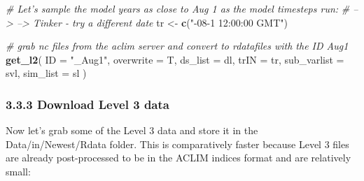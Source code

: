 \documentclass[
]{article}
\newenvironment{Shaded}{\begin{snugshade}}{\end{snugshade}}
\newcommand{\CommentTok}[1]{\textcolor[rgb]{0.56,0.35,0.01}{\textit{#1}}}
\newcommand{\DataTypeTok}[1]{\textcolor[rgb]{0.13,0.29,0.53}{#1}}
\newcommand{\KeywordTok}[1]{\textcolor[rgb]{0.13,0.29,0.53}{\textbf{#1}}}
\newcommand{\NormalTok}[1]{#1}
\newcommand{\StringTok}[1]{\textcolor[rgb]{0.31,0.60,0.02}{#1}}
\begin{document}
\begin{Shaded}
\begin{Highlighting}[]
    
    \CommentTok{# Let's sample the model years as close to Aug 1 as the model timesteps run:}
    \CommentTok{# --> --> Tinker - try a different date}
\NormalTok{    tr          <-}\StringTok{ }\KeywordTok{c}\NormalTok{(}\StringTok{"-08-1 12:00:00 GMT"}\NormalTok{) }
    
    \CommentTok{# grab nc files from the aclim server and convert to rdatafiles with the ID Aug1}
    \KeywordTok{get_l2}\NormalTok{(}
      \DataTypeTok{ID          =} \StringTok{"_Aug1"}\NormalTok{,}
      \DataTypeTok{overwrite   =}\NormalTok{  T,}
      \DataTypeTok{ds_list     =}\NormalTok{ dl,}
      \DataTypeTok{trIN        =}\NormalTok{ tr,}
      \DataTypeTok{sub_varlist =}\NormalTok{ svl,  }
      \DataTypeTok{sim_list    =}\NormalTok{ sl  )}
\end{Highlighting}
\end{Shaded}

\hypertarget{download-level-3-data}{%
\subsubsection{3.3.3 Download Level 3
data}\label{download-level-3-data}}

Now let's grab some of the Level 3 data and store it in the
Data/in/Newest/Rdata folder. This is comparatively faster because Level
3 files are already post-processed to be in the ACLIM indices format and
are relatively small:
\end{document}
